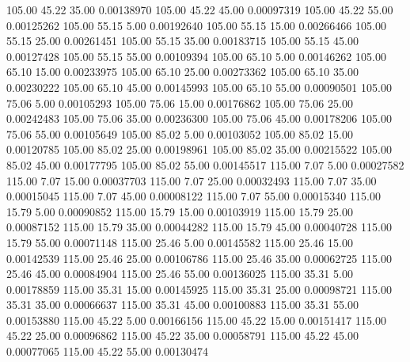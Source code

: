     105.00     45.22     35.00     0.00138970
    105.00     45.22     45.00     0.00097319
    105.00     45.22     55.00     0.00125262
    105.00     55.15      5.00     0.00192640
    105.00     55.15     15.00     0.00266466
    105.00     55.15     25.00     0.00261451
    105.00     55.15     35.00     0.00183715
    105.00     55.15     45.00     0.00127428
    105.00     55.15     55.00     0.00109394
    105.00     65.10      5.00     0.00146262
    105.00     65.10     15.00     0.00233975
    105.00     65.10     25.00     0.00273362
    105.00     65.10     35.00     0.00230222
    105.00     65.10     45.00     0.00145993
    105.00     65.10     55.00     0.00090501
    105.00     75.06      5.00     0.00105293
    105.00     75.06     15.00     0.00176862
    105.00     75.06     25.00     0.00242483
    105.00     75.06     35.00     0.00236300
    105.00     75.06     45.00     0.00178206
    105.00     75.06     55.00     0.00105649
    105.00     85.02      5.00     0.00103052
    105.00     85.02     15.00     0.00120785
    105.00     85.02     25.00     0.00198961
    105.00     85.02     35.00     0.00215522
    105.00     85.02     45.00     0.00177795
    105.00     85.02     55.00     0.00145517
    115.00      7.07      5.00     0.00027582
    115.00      7.07     15.00     0.00037703
    115.00      7.07     25.00     0.00032493
    115.00      7.07     35.00     0.00015045
    115.00      7.07     45.00     0.00008122
    115.00      7.07     55.00     0.00015340
    115.00     15.79      5.00     0.00090852
    115.00     15.79     15.00     0.00103919
    115.00     15.79     25.00     0.00087152
    115.00     15.79     35.00     0.00044282
    115.00     15.79     45.00     0.00040728
    115.00     15.79     55.00     0.00071148
    115.00     25.46      5.00     0.00145582
    115.00     25.46     15.00     0.00142539
    115.00     25.46     25.00     0.00106786
    115.00     25.46     35.00     0.00062725
    115.00     25.46     45.00     0.00084904
    115.00     25.46     55.00     0.00136025
    115.00     35.31      5.00     0.00178859
    115.00     35.31     15.00     0.00145925
    115.00     35.31     25.00     0.00098721
    115.00     35.31     35.00     0.00066637
    115.00     35.31     45.00     0.00100883
    115.00     35.31     55.00     0.00153880
    115.00     45.22      5.00     0.00166156
    115.00     45.22     15.00     0.00151417
    115.00     45.22     25.00     0.00096862
    115.00     45.22     35.00     0.00058791
    115.00     45.22     45.00     0.00077065
    115.00     45.22     55.00     0.00130474
